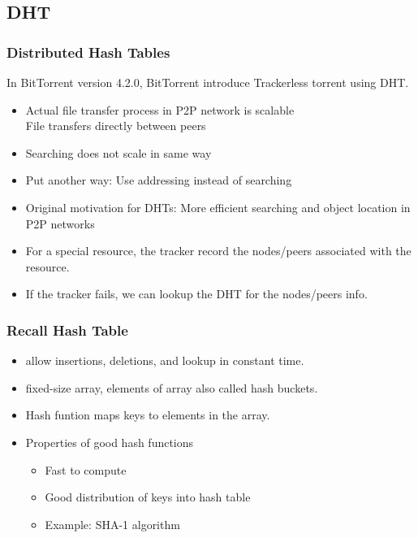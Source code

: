\subsection{DHT}

\begin{frame}
    \frametitle{Distributed Hash Tables}
    In BitTorrent version 4.2.0, BitTorrent introduce \alert{Trackerless} torrent using DHT.
    \begin{itemize}
        \item Actual file transfer process in P2P network is scalable \\
            File transfers directly between peers
        \item Searching does not scale in same way
        \item Put another way: Use addressing instead of searching
        \item Original motivation for DHTs: \alert{More efficient searching and object location in P2P networks}
        \item For a special resource, the tracker record the nodes/peers associated with the resource.
        \item If the tracker fails, we can \alert{lookup} the DHT for the nodes/peers info.
    \end{itemize}
\end{frame}

\begin{frame}
    \frametitle{Recall Hash Table}
    \begin{itemize}
        \item allow insertions, deletions, and lookup in constant time.
        \item fixed-size array, elements of array also called \alert{hash buckets}.
        \item Hash funtion maps keys to elements in the array.
        \item Properties of good hash functions
        \begin{itemize}
            \item Fast to compute
            \item Good distribution of keys into hash table
            \item Example: SHA-1 algorithm
        \end{itemize}
    \end{itemize}
\end{frame}

